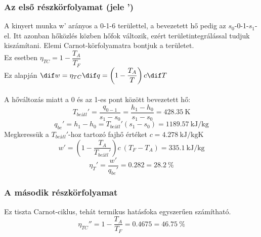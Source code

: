 \subsubsection{Az első részkörfolyamat (jele ')}
A kinyert munka w' arányos a 0-1-6 területtel, a bevezetett hő pedig az $s_0$-0-1-$s_1$-el. Itt azonban hőközlés közben hőfok változik, ezért területintegrálással tudjuk kiszámítani. Elemi Carnot-körfolyamatra bontjuk a területet.
\\Ez esetben  $\eta_{TC}=1-\dfrac{T_A}{T_F}$
\\Ez alapján	$\dif w=\eta_{TC}  \dif q= \left (1-\dfrac{T_A}{T} \right) c \dif T$
\\\\A hőváltozás miatt a 0 és az 1-es pont között bevezetett hő:
\begin{equation*}
	T_{be \textit{átl}}'=\dfrac{q_{0 - 1}} {s_1 - s_0}=\dfrac{h_1-h_0}{s_1-s_0}=\SI{428.35}{\kelvin}	
\end{equation*}
\begin{equation*}
	q_{be}'=h_1 - h_0=T_{be\textit{átl}}' \left (s_1-s_0 \right)=\SI{1189.57}{\kilo\joule\per\kilogram}	
\end{equation*}
Megkeressük a $T_{be \textit{átl}}'$-hoz tartozó fajhő értéket $c=\SI{4.278}{\kilo\joule\per\kilogram\kelvin}$
\begin{equation*}
	w'=\left (1-\dfrac{T_A}{T_{be\textit{átl}}'} \right) c \!\ \left(T_F-T_A \right)=\SI{335.1}{\kilo\joule\per\kilogram}	
\end{equation*}
\begin{equation*}
	\eta_T'=\dfrac{w'}{q_{be}'}=\SI{0.282}
    =
	\SI{28.2}{\%}	
\end{equation*}
\subsubsection{A második részkörfolyamat}
Ez tiszta Carnot-ciklus, tehát termikus hatásfoka egyszerűen számítható.
\begin{equation*}
	\eta_{TC}''=1-\dfrac{T_A}{T_F}=\SI{0.4675}
	=
	\SI{46.75}{\%}	
\end{equation*}

